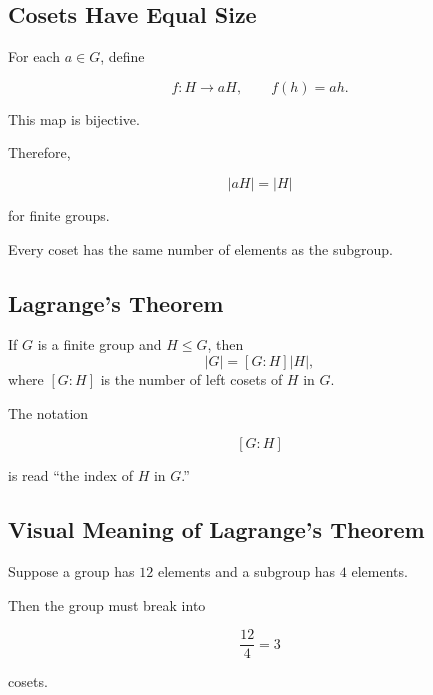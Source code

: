 \subsection{Cosets Have Equal Size}
\label{subsec:cosets-equal-size}

For each \(a\in G\), define

\[ f:H\to aH,\qquad f(h)=ah. \]

This map is bijective.

Therefore,

\[ |aH|=|H| \]

for finite groups.

Every coset has the same number of elements as the subgroup.

\subsection{Lagrange's Theorem}
\label{subsec:lagrange-theorem}

\begin{theorem}
If \(G\) is a finite group and \(H\leq G\), then
\[ |G|=[G:H]|H|, \]
where \([G:H]\) is the number of left cosets of \(H\) in \(G\).
\end{theorem}

The notation

\[ [G:H] \]

is read ``the index of \(H\) in \(G\).''

\subsection{Visual Meaning of Lagrange's Theorem}
\label{subsec:visual-lagrange}

Suppose a group has \(12\) elements and a subgroup has \(4\) elements.

Then the group must break into

\[ \frac{12}{4}=3 \]

cosets.

\begin{center}
\end{center}

